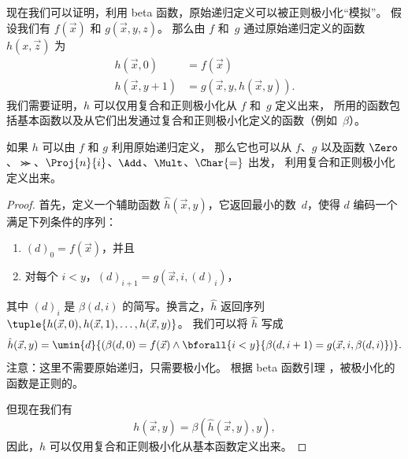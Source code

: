 \documentclass[../../../include/open-logic-section]{subfiles}
\begin{document}

现在我们可以证明，利用 beta 函数，原始递归定义可以被正则极小化“模拟”。
假设我们有 $f(\vec x)$ 和 $g(\vec x, y, z)$。
那么由 $f$ 和~$g$ 通过原始递归定义的函数~$h(x,\vec z)$ 为
\begin{align*}
h(\vec x, 0) & =  f(\vec x) \\
h(\vec x, y+1) & =  g(\vec x, y, h(\vec x, y)).
\end{align*}
我们需要证明，$h$ 可以仅用复合和正则极小化从 $f$ 和~$g$ 定义出来，
所用的函数包括基本函数以及从它们出发通过复合和正则极小化定义的函数（例如~$\beta$）。

\begin{lem}
如果 $h$ 可以由 $f$ 和 $g$ 利用原始递归定义，
那么它也可以从 $f$、$g$ 以及函数 $\Zero$、$\Succ$、$\Proj{n}{i}$、$\Add$、$\Mult$、$\Char{=}$ 出发，
利用复合和正则极小化定义出来。
\end{lem}

\begin{proof}
首先，定义一个辅助函数 $\hat h(\vec x, y)$，它返回最小的数~$d$，使得 $d$ 编码一个满足下列条件的序列：
\begin{enumerate}
\item $(d)_0 = f(\vec x)$，并且
\item 对每个 $i < y$，$(d)_{i+1} = g(\vec x, i, (d)_i)$，
\end{enumerate}
其中 $(d)_i$ 是 $\beta(d,i)$ 的简写。换言之，$\hat h$ 返回序列 $\tuple{h(\vec x, 0), h(\vec x, 1), \dots, h(\vec
x, y)}$。
我们可以将 $\hat h$ 写成
\[
\hat h(\vec x, y) = \umin{d}{(\beta(d,0) = f(\vec x) \land \bforall{i <
  y}{\beta(d,i+1) = g(\vec x, i,\beta(d,i)})}.
\]
注意：这里不需要原始递归，只需要极小化。
根据 beta 函数引理 ，被极小化的函数是正则的。

但现在我们有
\[
h(\vec x, y) = \beta(\hat h(\vec x, y), y),
\]
因此，$h$ 可以仅用复合和正则极小化从基本函数定义出来。
\end{proof}
\end{document}
